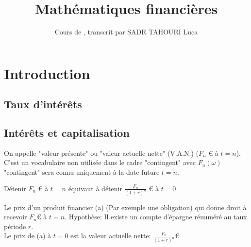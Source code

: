 \documentclass[]{report}
\title{Mathématiques financières}
\author{Cours de , transcrit par SADR TAHOURI Luca}
\date{}
\begin{document}
    \maketitle
    \tableofcontents

    \chapter{Introduction}

    \section{Taux d'intérêts}

    \section{Intérêts et capitalisation}

    \begin{df}{}{}
        On appelle "valeur présente" ou "valeur actuelle nette" (V.A.N.) ($F_n$ € à $t=n$). C'est un vocabulaire non utilisée dans le cadre "contingent" avec $F_n(\omega)$ "contingent" sera connu uniquement à la date future $t=n$.
    \end{df}

    \begin{re}{}{}
        Détenir $F_n$ € à $t=n$ équivaut à détenir $\frac{F_n}{(1+r)^n}$ € à $t=0$
    \end{re}

    Le prix d'un produit financier (a) (Par exemple une obligation) qui donne droit à recevoir $F_n$€ à $t=n$. Hypothèse: Il existe un compte d'épargne rémunéré au taux période $r$.\\
    Le prix de (a) à $t=0$ est la valeur actuelle nette: $\frac{F_n}{(1+r)^n}$€
\end{document}
